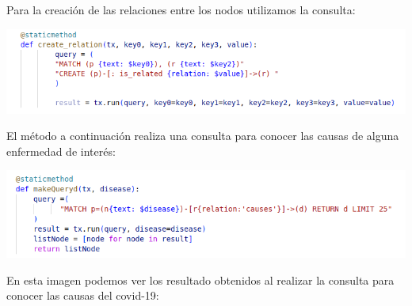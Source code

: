 \documentclass[10pt]{article} %
\begin{document}
	Para la creación de las relaciones entre los nodos utilizamos la consulta:
	
	 \begin{center}
		\includegraphics[scale=0.5]{../images/imageRelations}
	\end{center}

	El método a continuaci\'on realiza una consulta para conocer las causas de alguna enfermedad de interés:
	
	\begin{center}
		\includegraphics[scale=0.5]{../images/imageQuery}
	\end{center}

	En esta imagen podemos ver los resultado obtenidos al realizar la consulta para conocer las causas del covid-19:
	
\end{document}
